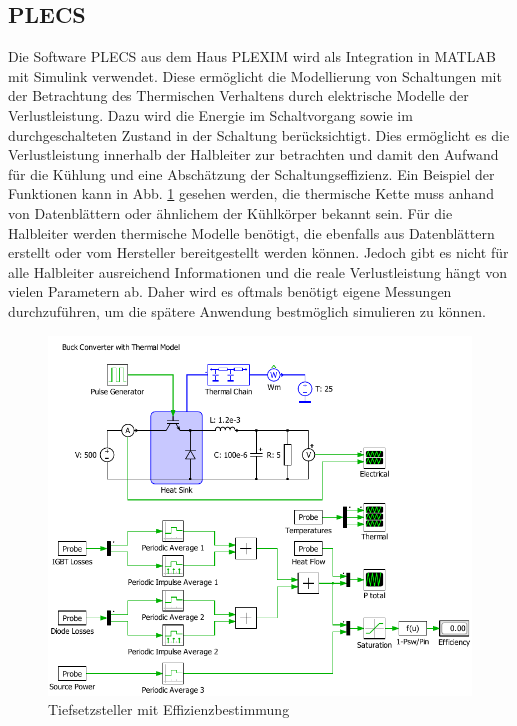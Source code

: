	\subsection{PLECS}
	Die Software \gls{PLECS} aus dem Haus PLEXIM wird als Integration in MATLAB mit Simulink verwendet.  Diese ermöglicht die Modellierung von Schaltungen mit der Betrachtung des Thermischen Verhaltens durch elektrische Modelle der Verlustleistung. Dazu wird die Energie im Schaltvorgang sowie im durchgeschalteten Zustand in der Schaltung berücksichtigt. Dies ermöglicht es die Verlustleistung innerhalb der Halbleiter zur betrachten und damit den Aufwand für die Kühlung und eine Abschätzung der Schaltungseffizienz. Ein Beispiel der Funktionen kann in Abb. \ref{fig:plecsbuck} gesehen werden, die thermische Kette muss anhand von Datenblättern oder ähnlichem der Kühlkörper bekannt sein. Für die Halbleiter werden thermische Modelle benötigt, die ebenfalls aus Datenblättern erstellt oder vom Hersteller bereitgestellt werden können. Jedoch gibt es nicht für alle Halbleiter ausreichend Informationen und die reale Verlustleistung hängt von vielen Parametern ab. Daher wird es oftmals benötigt eigene Messungen durchzuführen, um die spätere Anwendung bestmöglich simulieren zu können.   \\
	
	\begin{figure}
		\centering
		\includegraphics[width=0.9\linewidth]{content/Grafiken/PLECS_Buck}
		\caption[Tiefsetzsteller mit Effizienzbestimmung]{Tiefsetzsteller mit Effizienzbestimmung}
		\label{fig:plecsbuck}
	\end{figure}
	
